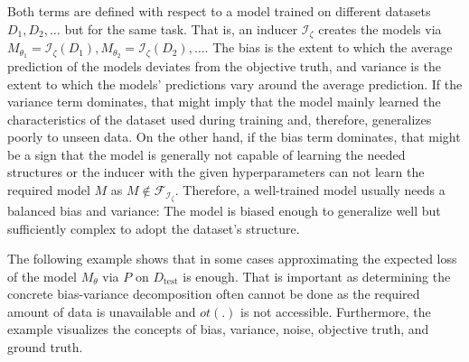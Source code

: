 Both terms are defined with respect to a model trained on different datasets $D_1,D_2,\dots$ but for the same task. That is, an inducer $\mathcal{I_\zeta}$ creates the models via $M_{\theta_1} = \mathcal{I_\zeta}(D_1), M_{\theta_2} = \mathcal{I_\zeta}(D_2),\dots$. The bias is the extent to which the average prediction of the models deviates from the objective truth, and variance is the extent to which the models' predictions vary around the average prediction.
If the variance term dominates, that might imply that the model mainly learned the characteristics of the dataset used during training and, therefore, generalizes poorly to unseen data. On the other hand, if the bias term dominates, that might be a sign that the model is generally not capable of learning the needed structures or the inducer with the given hyperparameters can not learn the required model $M$ as $M \not\in \mathcal{F_{I_\zeta}}$. Therefore, a well-trained model usually needs a balanced bias and variance: The model is biased enough to generalize well but sufficiently complex to adopt the dataset's structure. 

The following example shows that in some cases approximating the expected loss of the model $M_\theta$ via $P$ on $D_{\text{test}}$ is enough. That is important as determining the concrete bias-variance decomposition often cannot be done as the required amount of data is unavailable and $ot(.)$ is not accessible. Furthermore, the example visualizes the concepts of bias, variance, noise, objective truth, and ground truth.

